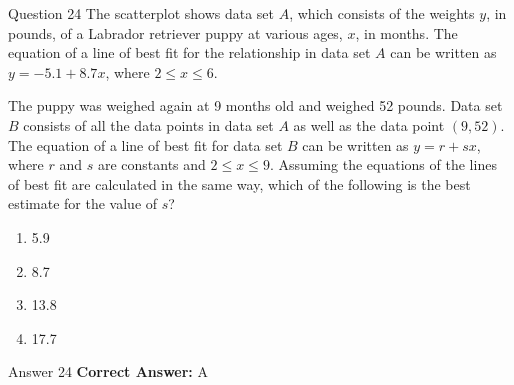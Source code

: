\documentclass{beamer}
\begin{document}
\begin{frame}{Question 24}
\small
The scatterplot shows data set $A$, which consists of the weights $y$, in pounds,  
of a Labrador retriever puppy at various ages, $x$, in months.  
The equation of a line of best fit for the relationship in data set $A$ can be written as  
$y = -5.1 + 8.7x$, where $2 \leq x \leq 6$.





\begin{center}
\end{center}




The puppy was weighed again at 9 months old and weighed 52 pounds.  
Data set $B$ consists of all the data points in data set $A$ as well as the data point $(9, 52)$.  
The equation of a line of best fit for data set $B$ can be written as $y = r + sx$,  
where $r$ and $s$ are constants and $2 \leq x \leq 9$.  
Assuming the equations of the lines of best fit are calculated in the same way,  
which of the following is the best estimate for the value of $s$?
\vspace{0.35cm}
\begin{enumerate}
    \item[A.] 5.9
    \item[B.] 8.7
    \item[C.] 13.8
    \item[D.] 17.7
\end{enumerate}
\end{frame}
\begin{frame}{Answer 24}
\small
\textbf{Correct Answer:} A
\end{frame}
\end{document}
